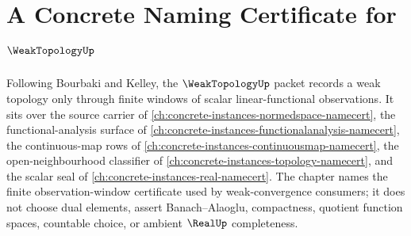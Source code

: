 \chapter{A Concrete Naming Certificate for $\WeakTopologyUp$}
\label{ch:concrete-instances-weak-topology-namecert}

Following Bourbaki and Kelley, the $\WeakTopologyUp$ packet records a weak topology only through finite windows of scalar linear-functional observations. It sits over the source carrier of \autoref{ch:concrete-instances-normedspace-namecert}, the functional-analysis surface of \autoref{ch:concrete-instances-functionalanalysis-namecert}, the continuous-map rows of \autoref{ch:concrete-instances-continuousmap-namecert}, the open-neighbourhood classifier of \autoref{ch:concrete-instances-topology-namecert}, and the scalar seal of \autoref{ch:concrete-instances-real-namecert}. The chapter names the finite observation-window certificate used by weak-convergence consumers; it does not choose dual elements, assert Banach--Alaoglu, compactness, quotient function spaces, countable choice, or ambient $\RealUp$ completeness.


